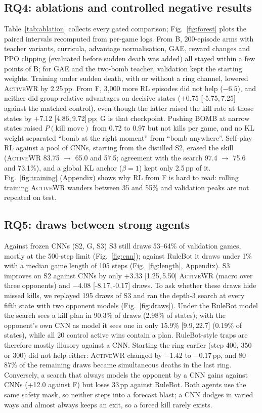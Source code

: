 \documentclass[11pt]{article}
\newcommand{\awr}{\textsc{ActiveWR}}
\newcommand{\pp}{\,pp}
\newcommand{\ci}[2]{[#1,\,#2]}
\begin{document}
\subsection{RQ4: ablations and controlled negative results}
\label{sec:rq4}
Table~\ref{tab:ablation} collects every gated comparison; Fig.~\ref{fig:forest} plots the paired intervals recomputed from per-game logs. From B, 200-episode arms with teacher variants, curricula, advantage normalisation, GAE, reward changes and PPO clipping (evaluated before sudden death was added) all stayed within a few points of B; for GAE and the two-bomb teacher, validation kept the starting weights. Training under sudden death, with or without a ring channel, lowered \awr{} by 2.25\pp{}. From F, 3{,}000 more RL episodes did not help ($-6.5$), and neither did group-relative advantages on decisive states ($+0.75$ \ci{-5.75}{7.25} against the matched control), even though the latter raised the kill rate at those states by $+7.12$ \ci{4.86}{9.72}\pp{}; G is that checkpoint. Pushing BOMB at narrow states raised $P(\text{kill move})$ from 0.72 to 0.97 but not kills per game, and no KL weight separated ``bomb at the right moment'' from ``bomb anywhere''. Self-play RL against a pool of CNNs, starting from the distilled S2, erased the skill (\awr{} 83.75 $\rightarrow$ 65.0 and 57.5; agreement with the search 97.4 $\rightarrow$ 75.6 and 73.1\%), and a global KL anchor ($\beta=1$) kept only 2.5\pp{} of it. Fig.~\ref{fig:training} (Appendix) shows why RL from F is hard to read: rolling training \awr{} wanders between 35 and 55\% and validation peaks are not repeated on test.

\subsection{RQ5: draws between strong agents}
\label{sec:rq5}
Against frozen CNNs (S2, G, S3) S3 still draws 53--64\% of validation games, mostly at the 500-step limit (Fig.~\ref{fig:cnn}); against RuleBot it draws under 1\% with a median game length of 105 steps (Fig.~\ref{fig:length}, Appendix). S3 improves on S2 against CNNs by only $+3.33$ \ci{1.25}{5.50} \awr{} (macro over three opponents) and $-4.08$ \ci{-8.17}{-0.17} draws. To ask whether these draws hide missed kills, we replayed 195 draws of S3 and ran the depth-3 search at every fifth state with two opponent models (Fig.~\ref{fig:draws}). Under the RuleBot model the search sees a kill plan in 90.3\% of draws (2.98\% of states); with the opponent's own CNN as model it sees one in only 15.9\% \ci{9.9}{22.7} (0.19\% of states), while all 20 control active wins contain a plan. RuleBot-style traps are therefore mostly illusory against a CNN. Starting the ring earlier (step 400, 350 or 300) did not help either: \awr{} changed by $-1.42$ to $-0.17$\pp{}, and 80--87\% of the remaining draws became simultaneous deaths in the last ring. Conversely, a search that always models the opponent by a CNN gains against CNNs (+12.0 against F) but loses 33\pp{} against RuleBot. Both agents use the same safety mask, so neither steps into a forecast blast; a CNN dodges in varied ways and almost always keeps an exit, so a forced kill rarely exists.
\end{document}
